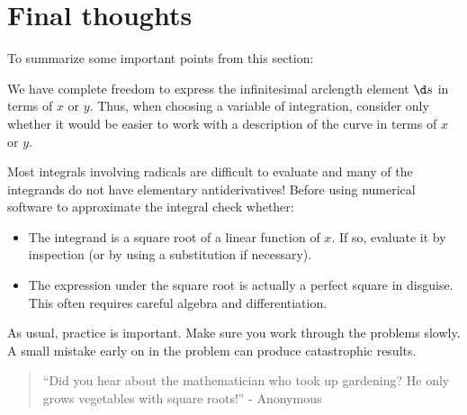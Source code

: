 \documentclass{ximera}
\begin{document}
\section{Final thoughts}
To summarize some important points from this section:


\begin{fact}
We have complete freedom to express the infinitesimal arclength element $\d s$ in terms of $x$ or $y$.  Thus, when choosing a variable of integration, consider only whether it would be easier to work with a description of the curve in terms of $x$ or $y$.\end{fact}

\begin{fact}
Most integrals involving radicals are difficult to evaluate and many of the integrands do not have elementary antiderivatives!  Before using numerical software to approximate the integral check whether:

\begin{itemize}
\item The integrand is a square root of a linear function of $x$.  If so, evaluate it by inspection (or by using a substitution if necessary).
\item The expression under the square root is actually a perfect square in disguise.  This often requires careful algebra and differentiation.
\end{itemize}
\end{fact}

As usual, practice is important.  Make sure you work through the problems slowly.  A small mistake early on in the problem can produce catastrophic results.

\begin{quote}
``Did you hear about the mathematician who took up gardening?  He only grows vegetables with square roots!'' - Anonymous
\end{quote}
\end{document}
